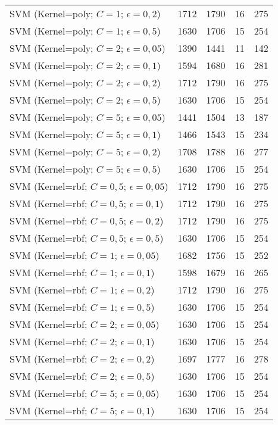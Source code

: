 \begin{center}
\begin{longtable}{|l|l|l|l|l|}
SVM (Kernel=poly; $C=1$; $\epsilon=0,2$) & 1712 & 1790 & 16 & 275 \\
SVM (Kernel=poly; $C=1$; $\epsilon=0,5$) & 1630 & 1706 & 15 & 254 \\
SVM (Kernel=poly; $C=2$; $\epsilon=0,05$) & 1390 & 1441 & 11 & 142 \\
SVM (Kernel=poly; $C=2$; $\epsilon=0,1$) & 1594 & 1680 & 16 & 281 \\
SVM (Kernel=poly; $C=2$; $\epsilon=0,2$) & 1712 & 1790 & 16 & 275 \\
SVM (Kernel=poly; $C=2$; $\epsilon=0,5$) & 1630 & 1706 & 15 & 254 \\
SVM (Kernel=poly; $C=5$; $\epsilon=0,05$) & 1441 & 1504 & 13 & 187 \\
SVM (Kernel=poly; $C=5$; $\epsilon=0,1$) & 1466 & 1543 & 15 & 234 \\
SVM (Kernel=poly; $C=5$; $\epsilon=0,2$) & 1708 & 1788 & 16 & 277 \\
SVM (Kernel=poly; $C=5$; $\epsilon=0,5$) & 1630 & 1706 & 15 & 254 \\
SVM (Kernel=rbf; $C=0,5$; $\epsilon=0,05$) & 1712 & 1790 & 16 & 275 \\
SVM (Kernel=rbf; $C=0,5$; $\epsilon=0,1$) & 1712 & 1790 & 16 & 275 \\
SVM (Kernel=rbf; $C=0,5$; $\epsilon=0,2$) & 1712 & 1790 & 16 & 275 \\
SVM (Kernel=rbf; $C=0,5$; $\epsilon=0,5$) & 1630 & 1706 & 15 & 254 \\
SVM (Kernel=rbf; $C=1$; $\epsilon=0,05$) & 1682 & 1756 & 15 & 252 \\
SVM (Kernel=rbf; $C=1$; $\epsilon=0,1$) & 1598 & 1679 & 16 & 265 \\
SVM (Kernel=rbf; $C=1$; $\epsilon=0,2$) & 1712 & 1790 & 16 & 275 \\
SVM (Kernel=rbf; $C=1$; $\epsilon=0,5$) & 1630 & 1706 & 15 & 254 \\
SVM (Kernel=rbf; $C=2$; $\epsilon=0,05$) & 1630 & 1706 & 15 & 254 \\
SVM (Kernel=rbf; $C=2$; $\epsilon=0,1$) & 1630 & 1706 & 15 & 254 \\
SVM (Kernel=rbf; $C=2$; $\epsilon=0,2$) & 1697 & 1777 & 16 & 278 \\
SVM (Kernel=rbf; $C=2$; $\epsilon=0,5$) & 1630 & 1706 & 15 & 254 \\
SVM (Kernel=rbf; $C=5$; $\epsilon=0,05$) & 1630 & 1706 & 15 & 254 \\
SVM (Kernel=rbf; $C=5$; $\epsilon=0,1$) & 1630 & 1706 & 15 & 254 \\

\end{longtable}
\end{center}
